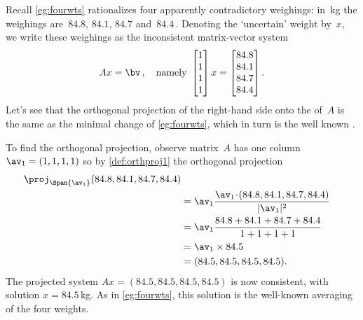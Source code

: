\begin{example} \label{eg:fourwts2}
Recall \cref{eg:fourwts} rationalizes four apparently contradictory weighings: in~kg the weighings are~\(84.8\), \(84.1\), \(84.7\) and~\(84.4\)\,.
Denoting the `uncertain' weight by~\(x\),  we write these weighings as the inconsistent matrix-vector system
\begin{equation*}
Ax=\bv\,,\quad\text{namely }
\begin{bmatrix} 1\\1\\1\\1 \end{bmatrix}x
=\begin{bmatrix} 84.8\\84.1\\84.7\\84.4 \end{bmatrix}.
\end{equation*}
Let's see that the orthogonal projection of the right-hand side onto the  of~\(A\) is the same as the minimal change of \cref{eg:fourwts}, which in turn is the well known .

To find the orthogonal projection, observe matrix~\(A\) has one column \(\av_1=(1,1,1,1)\) so by \cref{def:orthproj1} the orthogonal projection
\begin{align*}
\proj_{\Span\{\av_1\}}(84.8,84.1,84.7,84.4)
\\&=\av_1\frac{\av_1\cdot(84.8,84.1,84.7,84.4)}{|\av_1|^2}
\\&=\av_1\frac{84.8+84.1+84.7+84.4}{1+1+1+1}
\\&=\av_1\times 84.5
\\&=(84.5,84.5,84.5,84.5).
\end{align*}
The projected system \(Ax=(84.5,84.5,84.5,84.5)\) is now consistent, with solution \(x=84.5\)\,kg.
As in \cref{eg:fourwts}, this solution is the well-known averaging of the four weights.
\end{example}


